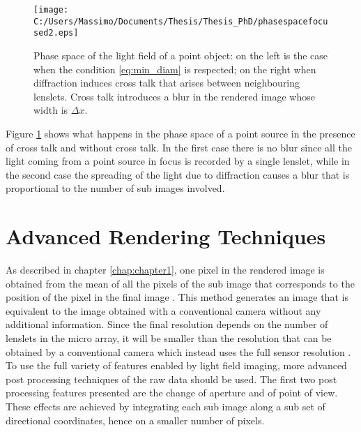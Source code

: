\begin{figure}[H]
	\centering
	\texttt{[image: C:/Users/Massimo/Documents/Thesis/Thesis\_PhD/phasespacefocused2.eps]}
	\caption{\label{fig:crosstalk2}Phase space of the light field of a point object: on the left is the case when the condition \ref{eq:min_diam} is respected; on the right when diffraction induces cross talk that arises between neighbouring lenslets. Cross talk introduces a blur in the rendered image whose width is $\Delta x$. }
\end{figure}
Figure \ref{fig:crosstalk2} shows what happens in the phase space of a point source in the presence of cross talk and without cross talk. In the first case there is no blur since all the light coming from a point source in focus is recorded by a single lenslet, while in the second case the spreading of the light due to diffraction causes a blur that is proportional to the number of sub images involved. 
\section{Advanced Rendering Techniques}
As described in chapter \ref{chap:chapter1}, one pixel in the rendered image is obtained from the mean of all the pixels of the sub image that corresponds to the position of the pixel in the final image \cite{ng2006digital}. This method generates an image that is equivalent to the image obtained with a conventional camera without any additional information. Since the final resolution depends on the number of lenslets in the micro array, it will be smaller than the resolution that can be obtained by a conventional camera which instead uses the full sensor resolution \cite{georgiev2010focused}. To use the full variety of features enabled by light field imaging, more advanced post processing techniques of the raw data should be used. The first two post processing features presented are the change of aperture and of point of view. These effects are achieved by integrating each sub image along a sub set of directional coordinates, hence on a smaller number of pixels. 
